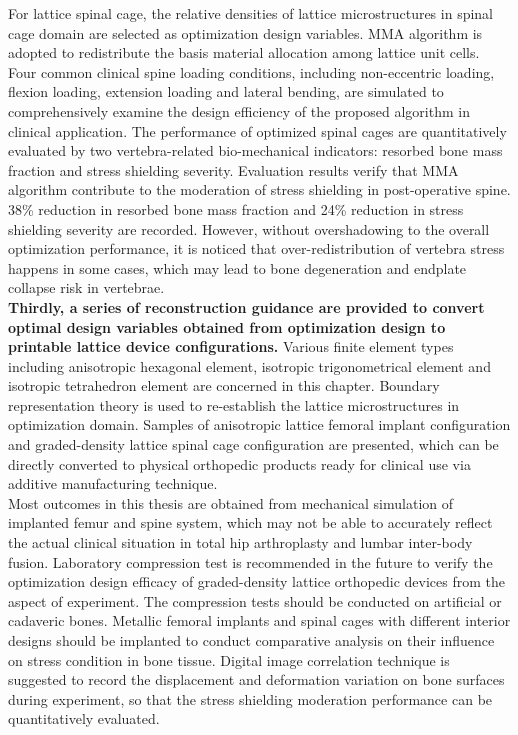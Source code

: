 \documentclass[12pt]{extbook}
\begin{document}
For lattice spinal cage, the relative densities of lattice microstructures in spinal cage domain are selected as optimization design variables. MMA algorithm is adopted to redistribute the basis material allocation among lattice unit cells. Four common clinical spine loading conditions, including non-eccentric loading, flexion loading, extension loading and lateral bending, are simulated to comprehensively examine the design efficiency of the proposed algorithm in clinical application. The performance of optimized spinal cages are quantitatively evaluated by two vertebra-related bio-mechanical indicators: resorbed bone mass fraction and stress shielding severity. Evaluation results verify that MMA algorithm contribute to the moderation of stress shielding in post-operative spine. 38\% reduction in resorbed bone mass fraction and 24\% reduction in stress shielding severity are recorded. However, without overshadowing to the overall optimization performance, it is noticed that over-redistribution of vertebra stress happens in some cases, which may lead to bone degeneration and endplate collapse risk in vertebrae.\\

{\bf Thirdly, a series of reconstruction guidance are provided to convert optimal design variables obtained from optimization design to printable lattice device configurations.} Various finite element types including anisotropic hexagonal element, isotropic trigonometrical element and isotropic tetrahedron element are concerned in this chapter. Boundary representation theory is used to re-establish the lattice microstructures in optimization domain. Samples of anisotropic lattice femoral implant configuration and graded-density lattice spinal cage configuration are presented, which can be directly converted to physical orthopedic products ready for clinical use via additive manufacturing technique.\\

Most outcomes in this thesis are obtained from mechanical simulation of implanted femur and spine system, which may not be able to accurately reflect the actual clinical situation in total hip arthroplasty and lumbar inter-body fusion. Laboratory compression test is recommended in the future to verify the optimization design efficacy of graded-density lattice orthopedic devices from the aspect of experiment. The compression tests should be conducted on artificial or cadaveric bones. Metallic femoral implants and spinal cages with different interior designs should be implanted to conduct comparative analysis on their influence on stress condition in bone tissue. Digital image correlation technique is suggested to record the displacement and deformation variation on bone surfaces during experiment, so that the stress shielding moderation performance can be quantitatively evaluated.\\
\newpage
\thispagestyle{empty}
~\\
\newpage
\setcounter{page}{1}

 

\end{document}

